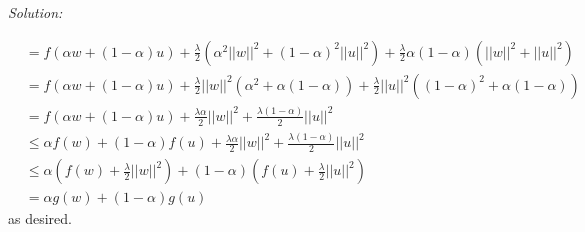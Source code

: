 \documentclass[
	10pt, %
	a4paper, %
	oneside, %
	headinclude,footinclude, %
	BCOR5mm, %
]{scrartcl}
\newenvironment{solution}
{\textit{Solution:}}
{}
\begin{document}
\begin{solution}
\begin{enumerate}[label= (\alph*)]
\begin{align*}
			       & = f(\alpha w + (1-\alpha)u) + \frac{\lambda}{2}\left(\alpha^2||w||^2 + {(1-\alpha)}^2||u||^2\right) + \frac{\lambda}{2}\alpha(1-\alpha)\left(||w||^2 + ||u||^2\right)   \\
			       & = f(\alpha w + (1-\alpha)u) + \frac{\lambda}{2}||w||^2\left(\alpha^2 + \alpha(1-\alpha)\right) + \frac{\lambda}{2}||u||^2\left({(1-\alpha)}^2 + \alpha(1-\alpha)\right) \\
			       & = f(\alpha w + (1-\alpha)u) + \frac{\lambda\alpha}{2}||w||^2 + \frac{\lambda(1-\alpha)}{2}||u||^2                                                                       \\
			       & \leq \alpha f(w) + (1-\alpha)f(u) + \frac{\lambda\alpha}{2}||w||^2 + \frac{\lambda(1-\alpha)}{2}||u||^2                                                                 \\
			       & \leq \alpha (f(w) + \frac{\lambda}{2}||w||^2) + (1-\alpha)(f(u) + \frac{\lambda}{2}||u||^2)                                                                             \\
			       & = \alpha g(w) + (1-\alpha)g(u)
		      \end{align*}
		      as desired.


\end{enumerate}
\end{solution}
\end{document}
